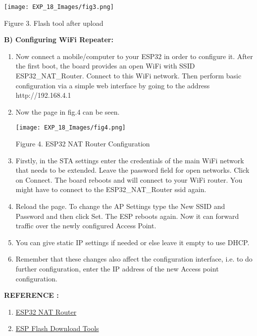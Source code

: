 \documentclass[12pt,a4paper]{article}
\begin{document}
\begin{justify}
\begin{center} 
\texttt{[image: EXP\_18\_Images/fig3.png]}
\end{center}
\begin{center} {Figure 3. Flash tool after upload}\end{center}

\textbf{B)	Configuring WiFi Repeater:}
\vspace{-6mm}
\begin{enumerate}
\setlength\itemsep{-0.3em}
\item Now connect a mobile/computer to your ESP32 in order to configure it. After the first boot, the board provides an open WiFi with SSID ESP32\_NAT\_Router. Connect to this WiFi network. Then perform basic configuration via a simple web interface by going to the address http://192.168.4.1 
\item Now the page in fig.4 can be seen.

\begin{center} 
\texttt{[image: EXP\_18\_Images/fig4.png]}
\end{center}
\begin{center} {Figure 4. ESP32 NAT Router Configuration}\end{center}
\item Firstly, in the STA settings enter the credentials of the main WiFi network that needs to be extended. Leave the password field for open networks. Click on Connect. The board reboots and will connect to your WiFi router. You might have to connect to the ESP32\_NAT\_Router ssid again.
\item Reload the page. To change the AP Settings type the New SSID and Password and then click Set. The ESP reboots again. Now it can forward traffic over the newly configured Access Point.
\item You can give static IP settings if needed or else leave it empty to use DHCP.
\item Remember that these changes also affect the configuration interface, i.e. to do further configuration, enter the IP address of the new Access point configuration.
\end{enumerate}
\setlength{\parindent}{0eM}
\textbf{\large REFERENCE :}
\begin{enumerate} 
\setlength\itemsep{-0.3em}
\item \href{https://github.com/martin-ger/esp32_nat_router}{
ESP32 NAT Router}
\item \href{https://www.espressif.com/en/support/download/other-tools  } {ESP Flash Download Tools}
\end{enumerate}
\end{justify}
\end{document}
